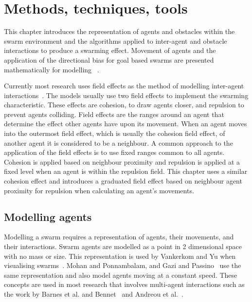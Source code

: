 \chapter{Methods, techniques, tools}\label{chapter:methods}
This chapter introduces the representation of agents and obstacles within the swarm environment and the algorithms applied to inter-agent and obstacle interactions to produce a swarming effect. Movement of agents and the application of the directional bias for goal based swarms are presented mathematically for modelling ~\cite{MP:10}. 

Currently most research uses field effects as the method of modelling inter-agent interactions~\cite{BAF:06, BAFVM:06, BM:09, APZDAMC:09, GP:02, GP:04, GP:04a, GP:05, GP:11, MYP:09}. The models usually use two field effects to implement the swarming characteristic. These effects are cohesion, to draw agents closer, and repulsion to prevent agents colliding. Field effects are the ranges around an agent that determine the effect other agents have upon its movement. When an agent moves into the outermost field effect, which is usually the cohesion field effect, of another agent it is considered to be a neighbour. A common approach to the application of the field effects is to use fixed ranges common to all agents. Cohesion is applied based on neighbour proximity and repulsion is applied at a fixed level when an agent is within the repulsion field. This chapter uses a similar cohesion effect and introduces a graduated field effect based on neighbour agent proximity for repulsion when calculating an agent's movements.

\section{Modelling agents}
Modelling a swarm requires a representation of agents, their movements, and their interactions. Swarm agents are modelled as a point in 2 dimensional space with no mass or size. This representation is used by Vankerkom and Yu when visualising swarms~\cite{VY:04}. Mohan and Ponnambalam, and Gazi and Passino~\cite{VY:04, GP:04} use the same representation and also model agents moving at a constant speed. These concepts are used in most research that involves multi-agent interactions such as the work by Barnes et al. and Bennet~\cite{BAF:06, BAFVM:06, BFV:07, BM:09} and Andreou et al.~\cite{APZDAMC:09}.

